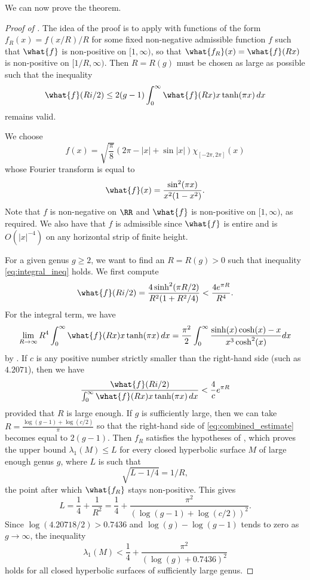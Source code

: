 \documentclass[12pt]{amsart}
\numberwithin{equation}{section}
\begin{document}
We can now prove the theorem.

\begin{proof}[Proof of ]
The idea of the proof is to apply  with functions of the form $f_R(x)=f(x/R)/R$ for some fixed non-negative admissible function $f$ such that $\what{f}$ is non-positive on $[1,\infty)$, so that $\what{f_R}(x) = \what{f}(Rx)$ is non-positive on $[1/R,\infty)$. Then $R=R(g)$ must be chosen as large as possible such that the inequality
\begin{equation} \label{eq:integral_ineq}
\what{f}(Ri/2) \leq 2(g-1)\int_0^\infty \what{f}(Rx) x \tanh(\pi x)\,dx
\end{equation}
remains valid. 

We choose
\[
f(x) = \sqrt{\frac{\pi}{8}}(2\pi - |x| +\sin|x|)\chi_{[-2\pi,2\pi]}(x) \]
whose Fourier transform is equal to
 \[
 \what{f}(x) = \frac{\sin^2(\pi x)}{x^2(1-x^2)}.
\]
Note that $f$ is non-negative on $\RR$ and $\what{f}$ is non-positive on $[1,\infty)$, as required. We also have that $f$ is admissible since $\what{f}$ is entire and is $O(|x|^{-4})$ on any horizontal strip of finite height.

For a given genus $g \geq 2$, we want to find an $R=R(g)>0$ such that inequality \eqref{eq:integral_ineq} holds. We first compute
\[
\what{f}(Ri/2)=  \frac{4\sinh^2(\pi R /2)}{R^2(1+R^2/4)} < \frac{4 e^{\pi R}}{R^4}.
\]
For the integral term, we have
\[
\lim_{R \to \infty} R^4\int_0^\infty \what{f}(Rx)x \tanh(\pi x)\,dx = \frac{\pi^2}{2}\int_0^\infty \frac{\sinh(x)\cosh(x)-x}{x^3\cosh^2(x)}dx
\]
by . If $c$ is any positive number strictly smaller than the right-hand side (such as $4.2071$), then we have
\begin{equation} \label{eq:combined_estimate}
\frac{\what{f}(Ri/2)}{\int_0^\infty \what{f}(Rx)x \tanh(\pi x)\,dx} < \frac{4}{c} e^{\pi R}
\end{equation}
provided that $R$ is large enough. If $g$ is sufficiently large, then we can take $R = \frac{\log(g-1)+\log(c/2)}{\pi}$ so that the right-hand side of \eqref{eq:combined_estimate} becomes equal to $2(g-1)$. Then $f_R$ satisfies the hypotheses of , which proves the upper bound $\lambda_1(M) \leq L$ for every closed hyperbolic surface $M$ of large enough genus $g$, where $L$ is such that \[\sqrt{L - 1/4} = 1/R,\] the point after which $\what{f_R}$ stays non-positive. This gives 
\[
L = \frac{1}{4} + \frac{1}{R^2} = \frac{1}{4} + \frac{\pi^2}{(\log(g-1)+\log(c/2))^2}.
\]
Since $\log(4.20718/2)> 0.7436$ and $\log(g) - \log(g-1)$ tends to zero as $g \to \infty$, the inequality
\[
\lambda_1(M) < \frac{1}{4} + \frac{\pi^2}{(\log(g)+0.7436)^2}
\]
holds for all closed hyperbolic surfaces of sufficiently large genus.
\end{proof}
\end{document}
